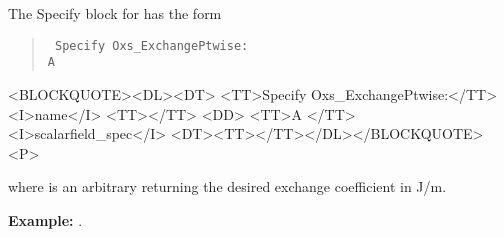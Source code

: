 \begin{itemize}
\begin{description}
   The Specify block for  has the form
   \begin{latexonly}
      \begin{quote}\tt
      Specify Oxs\_ExchangePtwise: \ocb\\
        \bi A \\
      \ccb
      \end{quote}
   \end{latexonly}
   \begin{rawhtml}<BLOCKQUOTE><DL><DT>
   <TT>Specify Oxs_ExchangePtwise:</TT><I>name</I> <TT>{</TT>
       <DD> <TT>A </TT><I>scalarfield_spec</I>
   <DT><TT>}</TT></DL></BLOCKQUOTE><P>
   \end{rawhtml}
   where  is an arbitrary
    returning the desired exchange
   coefficient in J/m.

   \textbf{Example:} .


\end{description}
\end{itemize}
